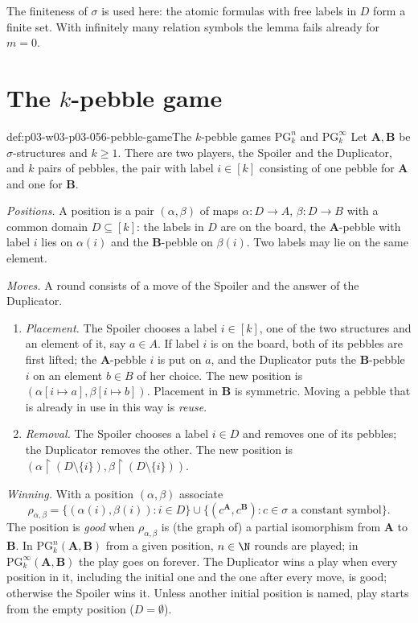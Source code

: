 The finiteness of \(\sigma\) is used here: the atomic formulas with free
labels in \(D\) form a finite set. With infinitely many relation symbols the
lemma fails already for \(m=0\).

\section{The \(k\)-pebble game}
\label{sec:p03-w03-p03-056-game}

\begin{hbdefinition}{def:p03-w03-p03-056-pebble-game}{The \(k\)-pebble games \(\mathrm{PG}^n_k\) and \(\mathrm{PG}^\infty_k\)}
Let \(\mathbf A,\mathbf B\) be \(\sigma\)-structures and \(k\geq1\). There
are two players, the Spoiler and the Duplicator, and \(k\) pairs of pebbles,
the pair with label \(i\in[k]\) consisting of one pebble for \(\mathbf A\)
and one for \(\mathbf B\).

\emph{Positions.} A position is a pair \((\alpha,\beta)\) of maps
\(\alpha:D\to A\), \(\beta:D\to B\) with a common domain \(D\subseteq[k]\):
the labels in \(D\) are on the board, the \(\mathbf A\)-pebble with label
\(i\) lies on \(\alpha(i)\) and the \(\mathbf B\)-pebble on \(\beta(i)\).
Two labels may lie on the same element.

\emph{Moves.} A round consists of a move of the Spoiler and the answer of
the Duplicator.
\begin{enumerate}
\item[(P)] \emph{Placement.} The Spoiler chooses a label \(i\in[k]\), one of
      the two structures and an element of it, say \(a\in A\). If label
      \(i\) is on the board, both of its pebbles are first lifted; the
      \(\mathbf A\)-pebble \(i\) is put on \(a\), and the Duplicator puts
      the \(\mathbf B\)-pebble \(i\) on an element \(b\in B\) of her choice.
      The new position is \((\alpha[i\mapsto a],\beta[i\mapsto b])\).
      Placement in \(\mathbf B\) is symmetric. Moving a pebble that is
      already in use in this way is \emph{reuse}.
\item[(R)] \emph{Removal.} The Spoiler chooses a label \(i\in D\) and removes
      one of its pebbles; the Duplicator removes the other. The new
      position is \((\alpha\restriction(D\setminus\{i\}),
      \beta\restriction(D\setminus\{i\}))\).
\end{enumerate}

\emph{Winning.} With a position \((\alpha,\beta)\) associate
\[
 \rho_{\alpha,\beta}=\{(\alpha(i),\beta(i)):i\in D\}\cup
 \{(c^{\mathbf A},c^{\mathbf B}):c\in\sigma\text{ a constant symbol}\}.
\]
The position is \emph{good} when \(\rho_{\alpha,\beta}\) is (the graph of) a
partial isomorphism from \(\mathbf A\) to \(\mathbf B\). In
\(\mathrm{PG}^n_k(\mathbf A,\mathbf B)\) from a given position, \(n\in\N\)
rounds are played; in \(\mathrm{PG}^\infty_k(\mathbf A,\mathbf B)\) the play
goes on forever. The Duplicator wins a play when every position in it,
including the initial one and the one after every move, is good; otherwise
the Spoiler wins it. Unless another initial position is named, play starts
from the empty position (\(D=\emptyset\)).


\end{hbdefinition}
